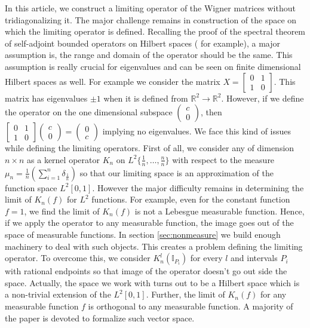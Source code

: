 \documentclass[reqno,12pt]{amsart}
\theoremstyle{plain}
\theoremstyle{definition}
\begin{document}
In this article, we construct a limiting operator of the Wigner matrices without tridiagonalizing it. The major challenge remains in construction of the space on which the limiting operator is defined. Recalling the proof of the spectral theorem of self-adjoint bounded operators on Hilbert spaces (\cite{bhatia2009notes} for example), a major assumption is, the range and domain of the operator should be the same. This assumption is really crucial for eigenvalues and can be seen on finite dimensional Hilbert spaces as well. For example we consider the matrix $X=\left[\begin{array}{cc}
   0  & 1 \\
    1 & 0
\end{array}\right].
$
This matrix has eigenvalues $\pm 1$ when it is defined from $\mathbb{R}^2 \to \mathbb{R}^2$. However, if we define the operator on the one dimensional subspace $\left( \begin{array}{c}
     c \\
     0 
\end{array} \right)$, then  $\left[\begin{array}{cc}
   0  & 1 \\
    1 & 0
\end{array}\right] \left( \begin{array}{c}
     c \\
     0 
\end{array} \right)= \left(\begin{array}{c}
     0  \\
     c 
\end{array} \right)$ implying no eigenvalues. We face this kind of issues while defining the limiting operators. First of all, we consider any of dimension $n \times n$ as a kernel operator $K_{n}$ on $L^{2}\{\frac{1}{n},\ldots, \frac{n}{n}  \}$ with respect to the measure $\mu_{n}= \frac{1}{n}\left( \sum_{i=1}^{n} \delta_{\frac{1}{n}} \right)$ so that our limiting space is an approximation of the function space $L^2[0,1]$. However the major difficulty remains in determining the limit of $K_{n}(f)$ for $L^{2}$ functions. For example, even for the constant function $f=1$, we find the limit of $K_{n}(f)$ is not a Lebesgue measurable function. Hence, if we apply the operator to any measurable function, the image goes out of the space of measurable functions. In section \ref{sec:nonmeasure} we build enough machinery to deal with such objects.  This creates a problem defining the limiting operator. To overcome this, we consider $K_{n}^{l}(\mathbb{I}_{P_{i}})$ for every $l$ and intervals $P_{i}$ with rational endpoints so that image of the operator doesn't go out side the space. Actually, the space we work with turns out to be a Hilbert space which is a non-trivial extension of the $L^{2}[0,1]$. Further, the limit of $K_{n}(f)$ for any measurable function $f$ is orthogonal to any measurable function.  A majority of the paper is devoted to formalize such vector space. 
\end{document}
